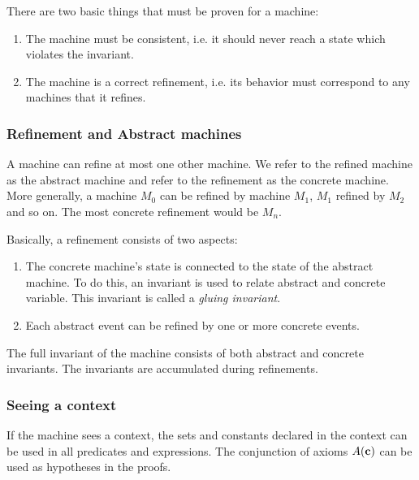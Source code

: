 There are two basic things that must be proven for a machine:
\begin{enumerate}
	\item The machine must be consistent, i.e. it should never reach a state which violates the invariant.
	\item The machine is a correct refinement, i.e. its behavior must correspond to any machines that it refines.
\end{enumerate}

\subsubsection{Refinement and Abstract machines}
\label{abstract_machine}

A machine can refine at most one other machine. 
We refer to the refined machine as the abstract machine and refer to the refinement as the concrete machine. 
More generally, a machine $M_0$ can be refined by machine $M_1$, $M_1$ refined by $M_2$ 
and so on. The most concrete refinement would be $M_n$. 

Basically, a refinement consists of two aspects:
\begin{enumerate}
	\item The concrete machine's state is connected to the state of the
      abstract machine. To do this, an invariant is used to relate abstract and concrete variable. 
      This invariant is called a \emph{gluing invariant}. 
	\item Each abstract event can be refined by one or more
concrete events.
\end{enumerate}

The full invariant of the machine consists of both abstract and concrete invariants. 
The invariants are accumulated during refinements.


\subsubsection{Seeing a context}
\label{seeing_a_context}
If the machine sees a context, the sets and constants declared in the context can be used in
 all predicates and expressions.
The conjunction of axioms $A(\mathbf{c})$ can be used as hypotheses in the proofs.

